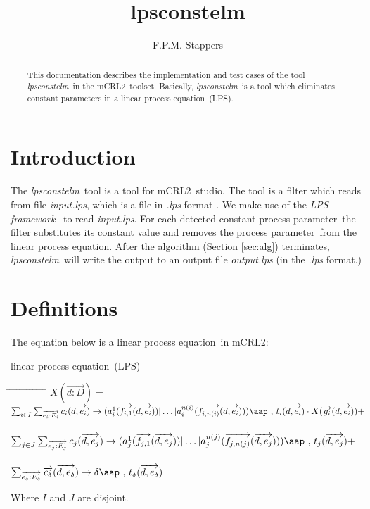 \index{}\documentclass[a4paper,10pt]{article}
\title{lpsconstelm}
\author{F.P.M. Stappers}
\theoremstyle{plain}
\theoremstyle{definition}
\newcommand{\lps}{linear process equation}
\newcommand{\tool}{\textit{lpsconstelm}}
\newcommand{\ovr}{\overrightarrow}
\newcommand{\mcrl}{mCRL2}
\newcommand{\framework}{\textit{LPS framework} \cite{LPSframework}}
\newcommand{\pp}{process parameter}
\newcommand{\ti}{\textit}
\newcommand{\tab}{\hspace*{5.mm} \= \hspace*{5.mm} \= \hspace*{5.mm} \= \hspace*{5.mm} \= \hspace*{5.mm} \= \hspace*{5.mm}  \= \hspace*{5.mm}  \= \hspace*{5.mm}  \= \hspace*{5.mm} \= \hspace*{5.mm} \= \hspace*{5.mm}  \= \hspace*{5.mm}  \= \hspace*{5.mm}\kill}
\newcommand{\at}[1]{\mbox{\aap ,} #1}
\begin{document}
\maketitle

\begin{abstract}
This documentation describes the implementation and test cases of the tool \tool\ in  the \mcrl\ toolset.
Basically, \tool\ is a tool which eliminates constant parameters in a \lps\ (LPS).
\end{abstract}

\tableofcontents

\section{Introduction}
The \tool\ tool is a tool for \mcrl\ studio. The tool is a
filter which reads from file \ti{input.lps}, which is
a file in \ti{.lps} format \cite{LPSformat}. We make use of the
\framework\ to read \ti{input.lps}. For
each detected constant \pp\ the filter substitutes its constant value and removes the \pp\ from the
\lps . After the algorithm (Section \ref{sec:alg}) terminates, \tool\
will write the output to an output file \ti{output.lps} (in the \ti{.lps} format.)

\section{Definitions} \label{sec:def}

The equation below is a \lps\ in \mcrl : 
\begin{defn}\lps\ (LPS) \newline
\begin{tabbing}
\tab
$X (\ovr{d: D}) = $ \> \> \> $ \sum_{i \in I} \sum_{\ovr{e_i: E_i}} c_i ( \ovr{d, e_i }) \rightarrow 
(a_i^1 (\ovr{f_{i,1}}(\ovr{d,e_i})) \vert \ldots \vert a_i^{n(i)}(\ovr{f_{i,n(i)}}(\ovr{d,e_i}))) \at \text{ } t_i(\ovr{d,e_i})  \cdot X(\ovr{g_i}(\ovr{d,e_i})) +$ \\ \\
\> \> \> $ \sum_{j \in J} \sum_{\ovr{e_j: E_j}} c_j ( \ovr{d, e_j} ) \rightarrow 
(a_j^1 (\ovr{f_{j,1}}(\ovr{d,e_j})) \vert \ldots \vert a_j^{n(j)}(\ovr{f_{j,n(j)}}(\ovr{d,e_j}))) \at \text{ } t_j(\ovr{d,e_j}) + $ \\ \\
\> \> \> $\sum_{\ovr{e_\delta:E_\delta}} \ovr{c_\delta} ( \ovr{d, e_\delta}) \rightarrow 
\delta \at \text{ } t_\delta(\ovr{d,e_\delta})$ 
\end{tabbing}

Where $I$ and $J$ are disjoint.\\
\end{defn}
\end{document}
